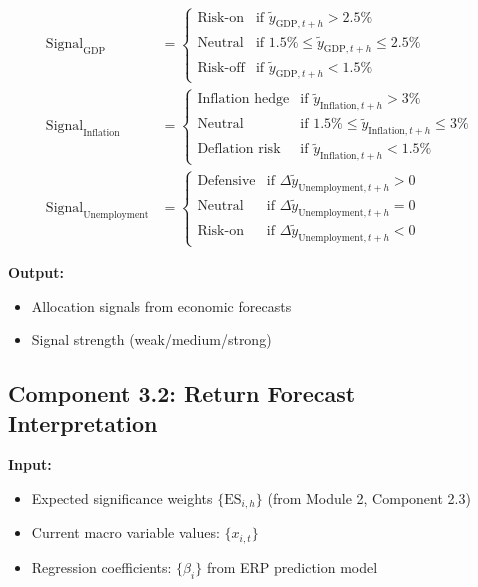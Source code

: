 \documentclass[11pt,a4paper]{article}
\begin{document}
\begin{align}
    \text{Signal}_{\text{GDP}} &= \begin{cases}
        \text{Risk-on} & \text{if } \tilde{y}_{\text{GDP},t+h} > 2.5\% \\
        \text{Neutral} & \text{if } 1.5\% \leq \tilde{y}_{\text{GDP},t+h} \leq 2.5\% \\
        \text{Risk-off} & \text{if } \tilde{y}_{\text{GDP},t+h} < 1.5\%
    \end{cases} \\
    \text{Signal}_{\text{Inflation}} &= \begin{cases}
        \text{Inflation hedge} & \text{if } \tilde{y}_{\text{Inflation},t+h} > 3\% \\
        \text{Neutral} & \text{if } 1.5\% \leq \tilde{y}_{\text{Inflation},t+h} \leq 3\% \\
        \text{Deflation risk} & \text{if } \tilde{y}_{\text{Inflation},t+h} < 1.5\%
    \end{cases} \\
    \text{Signal}_{\text{Unemployment}} &= \begin{cases}
        \text{Defensive} & \text{if } \Delta \tilde{y}_{\text{Unemployment},t+h} > 0 \\
        \text{Neutral} & \text{if } \Delta \tilde{y}_{\text{Unemployment},t+h} = 0 \\
        \text{Risk-on} & \text{if } \Delta \tilde{y}_{\text{Unemployment},t+h} < 0
    \end{cases}
\end{align}

\textbf{Output:}
\begin{itemize}
    \item Allocation signals from economic forecasts
    \item Signal strength (weak/medium/strong)
\end{itemize}

\subsection{Component 3.2: Return Forecast Interpretation}

\textbf{Input:}
\begin{itemize}
    \item Expected significance weights $\{\text{ES}_{i,h}\}$ (from Module 2, Component 2.3)
    \item Current macro variable values: $\{x_{i,t}\}$
    \item Regression coefficients: $\{\beta_i\}$ from ERP prediction model
\end{itemize}
\end{document}
